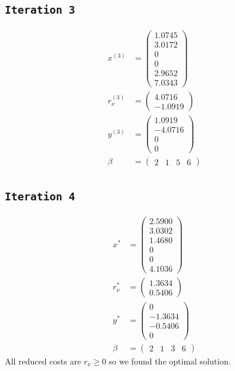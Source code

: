 \documentclass{assignment}
\def\code#1{\texttt{#1}}
\begin{document}
\subsection*{\code{Iteration 3}}
\begin{align*}
    x^{(3)} &= \begin{pmatrix} 1.0745 \\ 3.0172 \\ 0 \\ 0 \\ 2.9652 \\ 7.0343 \end{pmatrix} \\
    r_{\nu}^{(3)} &= \begin{pmatrix} 4.0716 \\ -1.0919 \end{pmatrix} \\
    y^{(3)} &= \begin{pmatrix} 1.0919 \\ -4.0716 \\ 0 \\ 0 \end{pmatrix} \\
    \beta &= \begin{pmatrix} 2 & 1 & 5 & 6 \end{pmatrix}
\end{align*}

\subsection*{\code{Iteration 4}}
\begin{align*}
    x^* &= \begin{pmatrix} 2.5900 \\ 3.0302 \\ 1.4680 \\ 0 \\ 0 \\ 4.1036 \end{pmatrix} \\
    r_{\nu}^* &= \begin{pmatrix} 1.3634 \\ 0.5406 \end{pmatrix} \\
    y^* &= \begin{pmatrix} 0 \\ -1.3634 \\ -0.5406 \\ 0 \end{pmatrix} \\
    \beta &= \begin{pmatrix} 2 & 1 & 3 & 6 \end{pmatrix}
\end{align*}
All reduced costs are $r_{\nu} \ge 0$ so we found the optimal solution.
\end{document}
